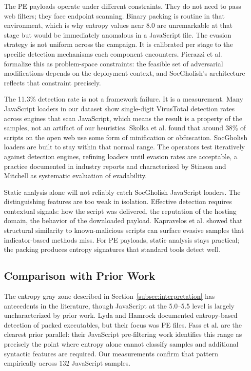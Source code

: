 \documentclass[pdflatex,sn-mathphys-num]{sn-jnl}
\theoremstyle{thmstyleone}%
\theoremstyle{thmstyletwo}%
\theoremstyle{thmstylethree}%
\begin{document}
The PE payloads operate under different constraints. They do not need to pass web filters; they face endpoint scanning. Binary packing is routine in that environment, which is why entropy values near 8.0 are unremarkable at that stage but would be immediately anomalous in a JavaScript file. The evasion strategy is not uniform across the campaign. It is calibrated per stage to the specific detection mechanisms each component encounters. Pierazzi et al. \cite{pierazzi2020} formalize this as problem-space constraints: the feasible set of adversarial modifications depends on the deployment context, and SocGholish's architecture reflects that constraint precisely.

The 11.3\% detection rate is not a framework failure. It is a measurement. Many JavaScript loaders in our dataset show single-digit VirusTotal detection rates across engines that scan JavaScript, which means the result is a property of the samples, not an artifact of our heuristics. Skolka et al. \cite{skolka2019} found that around 38\% of scripts on the open web use some form of minification or obfuscation. SocGholish loaders are built to stay within that normal range. The operators test iteratively against detection engines, refining loaders until evasion rates are acceptable, a practice documented in industry reports \cite{redcanary2023} and characterized by Stinson and Mitchell \cite{stinson2008} as systematic evaluation of evadability.

Static analysis alone will not reliably catch SocGholish JavaScript loaders. The distinguishing features are too weak in isolation. Effective detection requires contextual signals: how the script was delivered, the reputation of the hosting domain, the behavior of the downloaded payload. Kapravelos et al. \cite{kapravelos2013} showed that structural similarity to known-malicious scripts can surface evasive samples that indicator-based methods miss. For PE payloads, static analysis stays practical; the packing produces entropy signatures that standard tools detect well.

\subsection{Comparison with Prior Work}\label{subsec:comparison}

The entropy gray zone described in Section~\ref{subsec:interpretation} has antecedents in the literature, though JavaScript at the 5.0--5.5 level is largely uncharacterized by prior work. Lyda and Hamrock \cite{lyda2007} documented entropy-based detection of packed executables, but their focus was PE files. Fass et al. \cite{fass2018} are the clearest prior parallel: their JavaScript pre-filtering work identifies this range as precisely the point where entropy alone cannot classify samples and additional syntactic features are required. Our measurements confirm that pattern empirically across 132 JavaScript samples.
\end{document}
